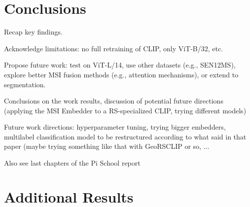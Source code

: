 \documentclass[a4paper, oneside, english]{sapthesis} %
\begin{document}
\chapter{Conclusions} %

Recap key findings.

Acknowledge limitations: no full retraining of CLIP, only ViT-B/32, etc.

Propose future work: test on ViT-L/14, use other datasets (e.g., SEN12MS), explore better MSI fusion methods (e.g., attention mechanisms), or extend to segmentation.

Conclusions on the work results, discussion of potential future directions (applying the MSI Embedder to a RS-specialized CLIP, trying different models)

Future work directions: hyperparameter tuning, trying bigger embedders, multilabel classification model to be restructured according to what said in that paper (maybe trying something like that with GeoRSCLIP or so, ...

Also see last chapters of the Pi School report



\cleardoublepage

\appendix
\chapter{Additional Results}
\end{document}
